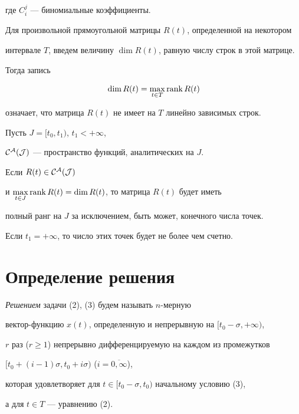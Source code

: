где $C_i^j$ --- биномиальные коэффициенты.


Для произвольной прямоугольной матрицы $R(t)$, определенной на некотором


интервале $T$, введем величину $\dim R(t)$, равную числу строк в этой матрице.


Тогда запись


$$


\dim R(t)=\max_{t \in T}\rank R(t)


$$


означает, что матрица $R(t)$ не имеет на $T$ линейно зависимых строк.





\begin{note}


Пусть $J=[t_0,t_1)$, $t_1<+\infty$,


$\cal C^A(J)$ --- пространство функций, аналитических на $J$.


Если $R(t) \in \cal C^A(J)$


и $\max\limits_{t \in J} \operatorname{rank} R(t)=\dim R(t)$, то матрица $R(t)$ будет иметь


полный ранг на $J$ за исключением, быть может, конечного числа точек.


Если $t_1=+\infty $, то число этих точек будет не более чем счетно.


\end{note}





\section{Определение решения}





\begin{defn}


{\it Решением} задачи (2), (3) будем называть $n$-мерную


вектор-функцию $x(t)$, определенную и непрерывную на $[t_0-\sigma,+\infty)$,


$r$ раз ($r\ge 1$) непрерывно дифференцируемую на каждом из промежутков


$[t_0+(i-1)\sigma, t_0+i\sigma )$ ($i=\overline{0,\infty}$),


которая удовлетворяет для $t \in [t_0-\sigma,t_0)$ начальному условию (3),


а для $t \in T$ --- уравнению (2).


\end{defn}





